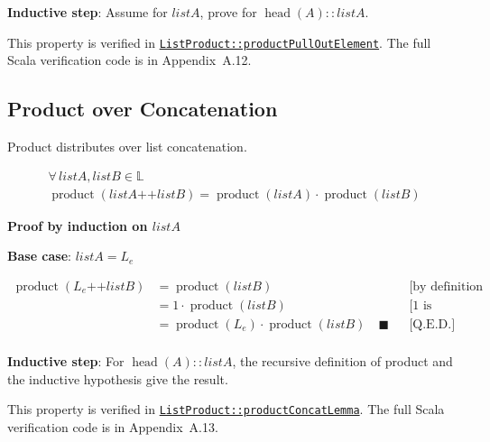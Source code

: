 \textbf{Inductive step}: Assume for $listA$, prove for
$\operatorname{head}(A) :: listA$.

{\raggedright
This property is verified in
\href{https://github.com/thiagomata/prime-numbers/blob/list-article-v1.0.0/src/main/scala/v1/chapter3/list/properties/ListProduct.scala}{\texttt{ListProduct::\allowbreak productPullOutElement}}.
The full Scala verification code is in Appendix~A.12.
\par}

\subsection{Product over Concatenation}

Product distributes over list concatenation.

\begin{gather*}
\forall\, listA, listB \in \mathbb{L} \\
\operatorname{product}(listA \mathbin{\texttt{++}} listB) = \operatorname{product}(listA) \cdot \operatorname{product}(listB)
\end{gather*}

\textbf{Proof by induction on $listA$}\par\nopagebreak

\textbf{Base case}: $listA = L_e$\par\nopagebreak

\begin{equation*}
\begin{aligned}
\operatorname{product}(L_e \mathbin{\texttt{++}} listB) &= \operatorname{product}(listB) && \text{[by definition of append]} \\
&= 1 \cdot \operatorname{product}(listB) && \text{[1 is multiplicative identity]} \\
&= \operatorname{product}(L_e) \cdot \operatorname{product}(listB) \quad \blacksquare && \text{[Q.E.D.]} \\
\end{aligned}
\end{equation*}

\textbf{Inductive step}: For $\operatorname{head}(A) :: listA$, the
recursive definition of product and the inductive hypothesis give the
result.

{\raggedright
This property is verified in
\href{https://github.com/thiagomata/prime-numbers/blob/list-article-v1.0.0/src/main/scala/v1/chapter3/list/properties/ListProduct.scala}{\texttt{ListProduct::\allowbreak productConcatLemma}}.
The full Scala verification code is in Appendix~A.13.
\par}

